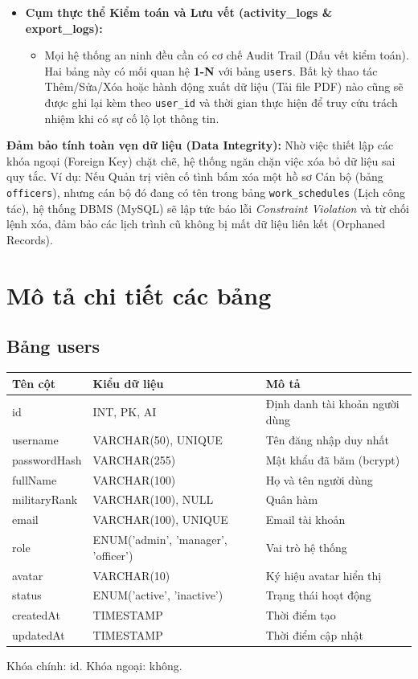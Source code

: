 \documentclass[18pt,a4paper]{report}
\begin{document}
\begin{itemize}[leftmargin=1.2cm]
    \item \textbf{Cụm thực thể Kiểm toán và Lưu vết (activity\_logs \& export\_logs):}
    \begin{itemize}
        \item Mọi hệ thống an ninh đều cần có cơ chế Audit Trail (Dấu vết kiểm toán). Hai bảng này có mối quan hệ \textbf{1-N} với bảng \texttt{users}. Bất kỳ thao tác Thêm/Sửa/Xóa hoặc hành động xuất dữ liệu (Tải file PDF) nào cũng sẽ được ghi lại kèm theo \texttt{user\_id} và thời gian thực hiện để truy cứu trách nhiệm khi có sự cố lộ lọt thông tin.
    \end{itemize}
\end{itemize}

\textbf{Đảm bảo tính toàn vẹn dữ liệu (Data Integrity):} 
Nhờ việc thiết lập các khóa ngoại (Foreign Key) chặt chẽ, hệ thống ngăn chặn việc xóa bỏ dữ liệu sai quy tắc. Ví dụ: Nếu Quản trị viên cố tình bấm xóa một hồ sơ Cán bộ (bảng \texttt{officers}), nhưng cán bộ đó đang có tên trong bảng \texttt{work\_schedules} (Lịch công tác), hệ thống DBMS (MySQL) sẽ lập tức báo lỗi \textit{Constraint Violation} và từ chối lệnh xóa, đảm bảo các lịch trình cũ không bị mất dữ liệu liên kết (Orphaned Records).

\section{Mô tả chi tiết các bảng}

\subsection{Bảng users}
\begin{longtable}{|>{\raggedright\arraybackslash}p{4.5cm}|>{\raggedright\arraybackslash}p{4.5cm}|>{\raggedright\arraybackslash}p{6.5cm}|}
\hline
\textbf{Tên cột} & \textbf{Kiểu dữ liệu} & \textbf{Mô tả} \\ \hline
id & INT, PK, AI & Định danh tài khoản người dùng \\ \hline
username & VARCHAR(50), UNIQUE & Tên đăng nhập duy nhất \\ \hline
passwordHash & VARCHAR(255) & Mật khẩu đã băm (bcrypt) \\ \hline
fullName & VARCHAR(100) & Họ và tên người dùng \\ \hline
militaryRank & VARCHAR(100), NULL & Quân hàm \\ \hline
email & VARCHAR(100), UNIQUE & Email tài khoản \\ \hline
role & ENUM('admin', 'manager', 'officer') & Vai trò hệ thống \\ \hline
avatar & VARCHAR(10) & Ký hiệu avatar hiển thị \\ \hline
status & ENUM('active', 'inactive') & Trạng thái hoạt động \\ \hline
createdAt & TIMESTAMP & Thời điểm tạo \\ \hline
updatedAt & TIMESTAMP & Thời điểm cập nhật \\ \hline
\end{longtable}
Khóa chính: id. Khóa ngoại: không.
\end{document}
